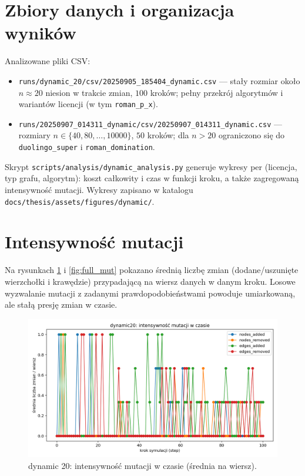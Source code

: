 \section{Zbiory danych i organizacja wyników}

Analizowane pliki CSV:
\begin{itemize}
  \item \texttt{runs/dynamic\_20/csv/20250905\_185404\_dynamic.csv} — stały rozmiar około $n\approx20$ niesion w trakcie zmian, $100$ kroków; pełny przekrój algorytmów i wariantów licencji (w tym \texttt{roman\_p\_x}).
  \item \texttt{runs/20250907\_014311\_dynamic/csv/20250907\_014311\_dynamic.csv} — rozmiary $n\in\{40,80,\dots,10000\}$, $50$ kroków; dla $n>20$ ograniczono się do \texttt{duolingo\_super} i \texttt{roman\_domination}.
\end{itemize}
Skrypt \texttt{scripts/analysis/dynamic\_analysis.py} generuje wykresy per (licencja, typ grafu, algorytm): koszt całkowity i czas w funkcji kroku, a także zagregowaną intensywność mutacji. Wykresy zapisano w katalogu \texttt{docs/thesis/assets/figures/dynamic/}.

\section{Intensywność mutacji}

Na rysunkach \ref{fig:dyn20_mut} i \ref{fig:full_mut} pokazano średnią liczbę zmian (dodane/uszunięte wierzchołki i krawędzie) przypadającą na wiersz danych w danym kroku. Losowe wyzwalanie mutacji z zadanymi prawdopodobieństwami powoduje umiarkowaną, ale stałą presję zmian w czasie.

\begin{figure}[H]
  \centering
  \includegraphics[width=0.75\linewidth]{assets/figures/dynamic/dynamic20_mutation_intensity.png}
\caption{dynamic 20: intensywność mutacji w czasie (średnia na wiersz).}
  \label{fig:dyn20_mut}
\end{figure}

